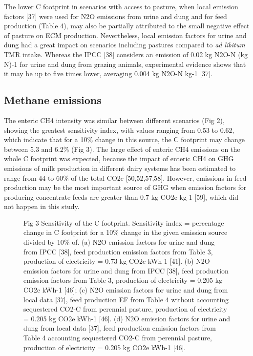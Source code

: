 \documentclass[11pt,a4paper]{article}
\begin{document}
The lower C footprint in scenarios with access to pasture, when local emission factors [37] were used for N2O emissions from urine and dung and for feed production (Table 4), may also be partially attributed to the small negative effect of pasture on ECM production. Nevertheless, local emission factors for urine and dung had a great impact on scenarios including pastures compared to \textit{ad libitum} TMR intake. Whereas the IPCC [38] considers an emission of 0.02 kg N2O-N (kg N)-1 for urine and dung from grazing animals, experimental evidence shows that it may be up to five times lower, averaging 0.004 kg N2O-N kg-1 [37].

\subsection{Methane emissions}

The enteric CH4 intensity was similar between different scenarios (Fig 2), showing the greatest sensitivity index, with values ranging from 0.53 to 0.62, which indicate that for a 10\% change in this source, the C footprint may change between 5.3 and 6.2\% (Fig 3). The large effect of enteric CH4 emissions on the whole C footprint was expected, because the impact of enteric CH4 on GHG emissions of milk production in different dairy systems has been estimated to range from 44 to 60\% of the total CO2e [50,52,57,58]. However, emissions in feed production may be the most important source of GHG when emission factors for producing concentrate feeds are greater than 0.7 kg CO2e kg-1 [59], which did not happen in this study.

\begin{figure}[h]
\caption{Fig 3 Sensitivity of the C footprint. Sensitivity index = percentage change in C footprint for a 10\% change in the given emission source divided by 10\% of. (a) N2O emission factors for urine and dung from IPCC [38], feed production emission factors from Table 3, production of electricity = 0.73 kg CO2e kWh-1 [41]. (b) N2O emission factors for urine and dung from IPCC [38], feed production emission factors from Table 3, production of electricity = 0.205 kg CO2e kWh-1 [46]; (c) N2O emission factors for urine and dung from local data [37], feed production EF from Table 4 without accounting sequestered CO2-C from perennial pasture, production of electricity = 0.205 kg CO2e kWh-1 [46]. (d) N2O emission factors for urine and dung from local data [37], feed production emission factors from Table 4 accounting sequestered CO2-C from perennial pasture, production of electricity = 0.205 kg CO2e kWh-1 [46].}
\end{figure}
\end{document}
